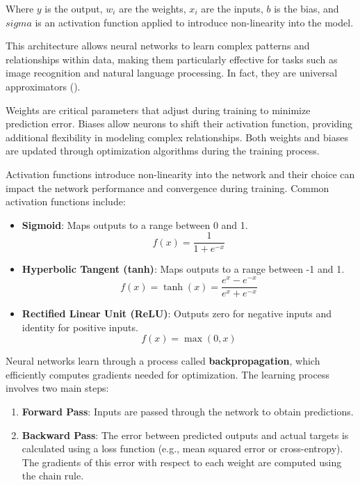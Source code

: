 Where \(y\) is the output, \(w_i\) are the weights, \(x_i\) are the inputs, \(b\) is the bias, and \(sigma\) is an activation function applied to introduce non-linearity into the model.

This architecture allows neural networks to learn complex patterns and relationships within data, making them particularly effective for tasks such as image recognition and natural language processing. In fact, they are universal approximators (\cite{HORNIK1989359,cybenko89}).


Weights are critical parameters that adjust during training to minimize prediction error. Biases allow neurons to shift their activation function, providing additional flexibility in modeling complex relationships. Both weights and biases are updated through optimization algorithms during the training process.

Activation functions introduce non-linearity into the network and their choice can impact the network performance and convergence during training. Common activation functions include:

\begin{itemize}
    \item \textbf{Sigmoid}: Maps outputs to a range between 0 and 1.
    \[
    f(x) = \frac{1}{1 + e^{-x}}
    \]
    
    \item \textbf{Hyperbolic Tangent (tanh)}: Maps outputs to a range between -1 and 1.
    \[
    f(x) = \tanh(x) = \frac{e^x - e^{-x}}{e^x + e^{-x}}
    \]
    
    \item \textbf{Rectified Linear Unit (ReLU)}: Outputs zero for negative inputs and identity for positive inputs.
    \[
    f(x) = \max(0, x)
    \]
\end{itemize}

Neural networks learn through a process called \textbf{backpropagation}, which efficiently computes gradients needed for optimization. The learning process involves two main steps: 

\begin{enumerate}
    \item \textbf{Forward Pass}: Inputs are passed through the network to obtain predictions.
    \item \textbf{Backward Pass}: The error between predicted outputs and actual targets is calculated using a loss function (e.g., mean squared error or cross-entropy). The gradients of this error with respect to each weight are computed using the chain rule.
\end{enumerate}

